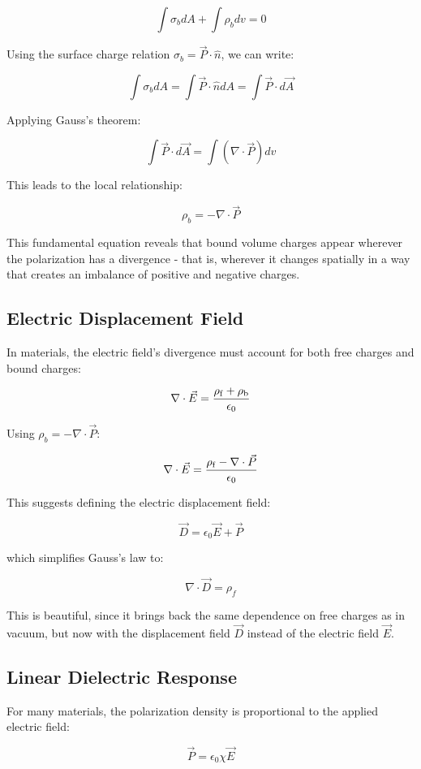 \documentclass[
  a4paper,
]{book}
\begin{document}
\[\int \sigma_b dA +\int \rho_b dv=0\]

Using the surface charge relation \(\sigma_b=\vec{P}\cdot\hat{n}\), we
can write:

\[\int \sigma_b dA = \int \vec{P}\cdot\hat{n}dA = \int \vec{P}\cdot d\vec{A}\]

Applying Gauss's theorem:

\[\int \vec{P}\cdot d\vec{A} = \int (\nabla\cdot\vec{P})dv\]

This leads to the local relationship:

\[\rho_b = -\nabla\cdot\vec{P}\]

This fundamental equation reveals that bound volume charges appear
wherever the polarization has a divergence - that is, wherever it
changes spatially in a way that creates an imbalance of positive and
negative charges.

\subsection{Electric Displacement
Field}\label{electric-displacement-field}

In materials, the electric field's divergence must account for both free
charges and bound charges:

\[
\nabla \cdot \vec{E}=\frac{\rho_{\rm f}+\rho_{\rm b}}{\epsilon_0}
\]

Using \(\rho_b=-\nabla\cdot \vec{P}\):

\[
\nabla \cdot \vec{E}=\frac{\rho_{\rm f}-\nabla\cdot \vec{P}}{\epsilon_0}
\]

This suggests defining the electric displacement field:

\[
\vec{D}=\epsilon_0 \vec{E}+\vec{P}
\]

which simplifies Gauss's law to:

\[
\nabla \cdot \vec{D} =\rho_f
\]

This is beautiful, since it brings back the same dependence on free
charges as in vacuum, but now with the displacement field \(\vec{D}\)
instead of the electric field \(\vec{E}\).

\subsection{Linear Dielectric
Response}\label{linear-dielectric-response}

For many materials, the polarization density is proportional to the
applied electric field:

\[
\vec{P}=\epsilon_0\chi\vec{E}
\]
\end{document}
